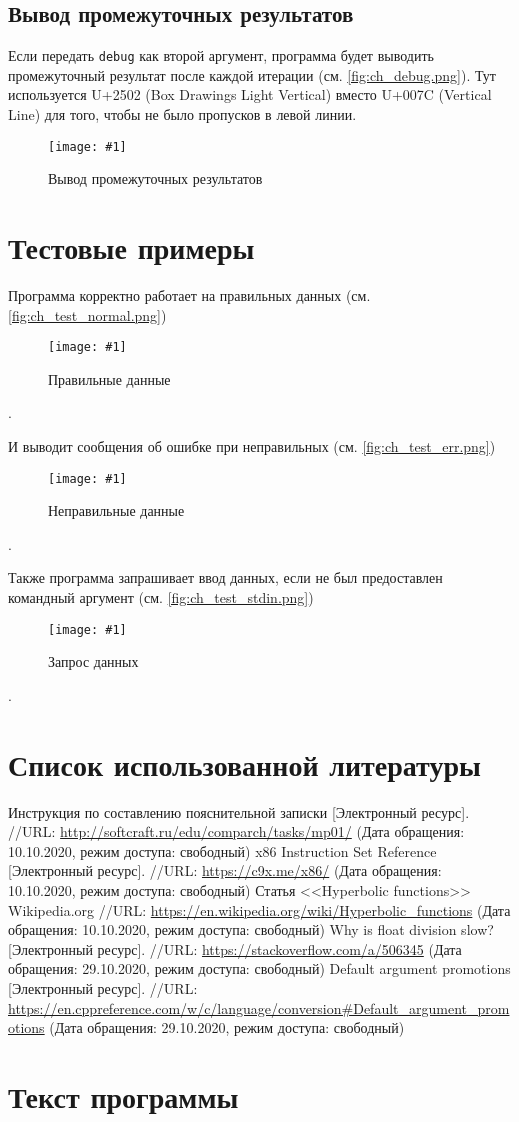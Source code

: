 \documentclass[a4paper]{article}
\newcommand{\CRTfigure}[2]{%
  \begin{figure}[h!]
    \centering
    \texttt{[image: \#1]}
    \caption{#2}
    \label{fig:#1}
  \end{figure}%
}
\newcommand{\CRTfigref}[2]{(см. \autoref{fig:#1})\CRTfigure{#1}{#2}}
\begin{document}
  \subsection{Вывод промежуточных результатов}
  Если передать \texttt{debug} как второй аргумент, программа будет выводить промежуточный результат после каждой итерации
  (см. \autoref{fig:ch_debug.png}).
  Тут используется U+2502 (Box Drawings Light Vertical) вместо U+007C (Vertical Line) для того, чтобы не было пропусков в левой линии.
  \CRTfigure{ch_debug.png}{Вывод промежуточных результатов}

  \newpage
  \section{Тестовые примеры}
  Программа корректно работает на правильных данных \CRTfigref{ch_test_normal.png}{Правильные данные}.

  И выводит сообщения об ошибке при неправильных \CRTfigref{ch_test_err.png}{Неправильные данные}.

  Также программа запрашивает ввод данных, если не был предоставлен командный аргумент \CRTfigref{ch_test_stdin.png}{Запрос данных}.

  \newpage
  \section{Список использованной литературы}
  \begin{thebibliography}{3}
     Инструкция по составлению пояснительной записки [Электронный ресурс].
      //URL: \url{http://softcraft.ru/edu/comparch/tasks/mp01/} (Дата обращения: 10.10.2020, режим доступа: свободный)
     x86 Instruction Set Reference [Электронный ресурс].
      //URL: \url{https://c9x.me/x86/} (Дата обращения: 10.10.2020, режим доступа: свободный)
     Статья <<Hyperbolic functions>> Wikipedia.org
      //URL: \url{https://en.wikipedia.org/wiki/Hyperbolic_functions} (Дата обращения: 10.10.2020, режим доступа: свободный)
     Why is float division slow? [Электронный ресурс].
      //URL: \url{https://stackoverflow.com/a/506345} (Дата обращения: 29.10.2020, режим доступа: свободный)
     Default argument promotions [Электронный ресурс].
      //URL: \url{https://en.cppreference.com/w/c/language/conversion#Default_argument_promotions} (Дата обращения: 29.10.2020, режим доступа: свободный)
  \end{thebibliography}

  \newpage
  \section{Текст программы}
  
\end{document}
